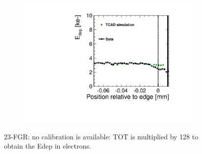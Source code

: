 \begin{figure}[htbp]
  \centering
  \begin{subfigure}[b]{0.5\linewidth}

    \caption{}
  \end{subfigure}\hfill
  \begin{subfigure}[b]{0.5\linewidth}
    \includegraphics[width=\textwidth]{figures/ActiveEdge/TCAD_data_23_FGR.pdf}
    \caption{}
  \end{subfigure}
  \caption{23-FGR: no calibration is available: TOT is multiplied by 128 to obtain the Edep in electrons.}
  \label{fig:TCAD_vs_data_23_FGR}
\end{figure}


